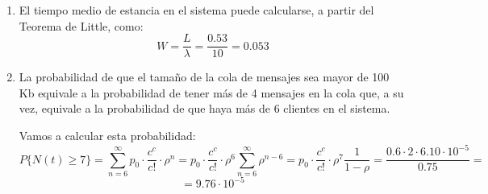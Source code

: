 \begin{problem}[11]
\begin{enumerate}
y aplicando nuevamente el teorema de Little para calcula W tenemos:
\[L_q = λ\left(\frac{L}{λ}-\frac{1}{μ}\right)=L-cρ\]

Empezamos calculando el factor de utilización del sistema:
\[ρ = \frac{λ}{2μ}=\frac{λT_s}{2}=10\cdot 25ms = 0.25\]

Calculemos ahora el número medio de unidades en el sistema:
\[L=\frac{P_qρ}{1-ρ}+cρ\]
pero antes necesitamos conocer $P_q$:

\[P_q = \frac{p_c}{1-ρ}\]
y para ello necesitamos $p_c$ siendo $c=2$.

Para calcular $p_2$ tenemos que emplear la fórmula:
\[p_2=p_0\frac{c^c}{c!} \left(\frac{λ}{cμ}\right)^n\]

para lo que necesitamos conocer $p_0$.

\[p_0 = \left(1+0.5+\frac{0.5^2}{2\cdot 0.75}\footnote{Puesto que ρ < 1}\right)^{-1} = \frac{1}{1.64}=0.6\]

Una vez tenemos esto podemos calcular $p_2$.
\[p_2=p_0\frac{c^c}{c!} \left(\frac{λ}{cμ}\right)^n=0.6\cdot \frac{4}{2}\cdot (0.25)^2 = 0.075\]

Con este valor procedemos a calcular $P_q$:
\[P_q = \frac{p_c}{1-ρ} = \frac{0.075}{0.75}=0.1\]

Y ya estamos en condiciones de calcular $L$:
\[L=\frac{P_qρ}{1-ρ}+cρ = \frac{0.1\cdot 0.25}{0.75}+2\cdot 0.25 = 0.53\]

Ahora calculamos $L_q$
\[L_q = L -cρ = 0.53 - 2 \cdot 0.25 = 0.03\]

Y por último multiplicamos por el tamaño de cada mensaje:
\[\text{ Tamaño medio = } 0.03\cdot 25 Kb = 0.75KB\]
\item

El tiempo medio de estancia en el sistema puede calcularse, a partir del Teorema de Little, como:
\[W = \frac{L}{λ} = \frac{0.53}{10} = 0.053\]


\item La probabilidad de que el tamaño de la cola de mensajes sea mayor de 100 Kb equivale a la probabilidad de tener más de 4 mensajes en la cola que, a su vez, equivale a la probabilidad de que haya más de 6 clientes en el sistema.

Vamos a calcular esta probabilidad:
\[P\{N(t) \geq 7\} = \sum_{n=6}^{\infty} p_0\cdot \frac{c^c}{c!} \cdot ρ^n=p_0\cdot \frac{c^c}{c!} \cdot ρ^6 \sum_{n=6}^{\infty}ρ^{n-6} =p_0\cdot \frac{c^c}{c!} \cdot ρ^7 \frac{1}{1-ρ} = \frac{0.6\cdot 2 \cdot 6.10 \cdot 10^{-5} }{0.75}=\]
\[=9.76 \cdot 10^{-5}\]
\end{enumerate}

\end{problem}

